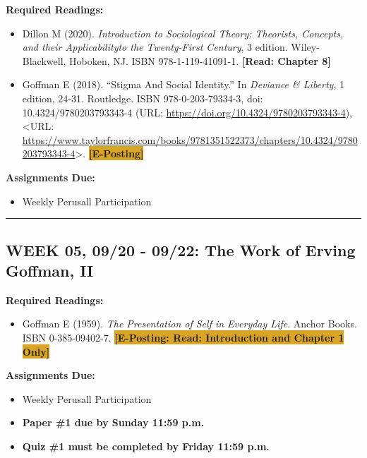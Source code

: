 \documentclass[11pt,]{article}
\providecommand{\tightlist}{%
  \setlength{\itemsep}{0pt}\setlength{\parskip}{0pt}}
\begin{document}
\textbf{Required Readings:}

\begin{itemize}
\item
  Dillon M (2020). \emph{Introduction to Sociological Theory: Theorists,
  Concepts, and their Applicabilityto the Twenty-First Century}, 3
  edition. Wiley-Blackwell, Hoboken, NJ. ISBN 978-1-119-41091-1.
  \textcolor{BrickRed}{\bf{[Read: Chapter 8]}}
\item
  Goffman E (2018). ``Stigma And Social Identity.'' In \emph{Deviance \&
  Liberty}, 1 edition, 24-31. Routledge. ISBN 978-0-203-79334-3, doi:
  10.4324/9780203793343-4 (URL:
  \url{https://doi.org/10.4324/9780203793343-4}), \textless URL:
  \url{https://www.taylorfrancis.com/books/9781351522373/chapters/10.4324/9780203793343-4}\textgreater.
  \colorbox{Goldenrod}{\bf{[E-Posting]}}
\end{itemize}

\textbf{Assignments Due:}

\begin{itemize}
\tightlist
\item
  Weekly Perusall Participation
\end{itemize}

\bigbreak
\hrule

\hypertarget{week-05-0920---0922-the-work-of-erving-goffman-ii}{%
\subsection{WEEK 05, 09/20 - 09/22: The Work of Erving Goffman,
II}\label{week-05-0920---0922-the-work-of-erving-goffman-ii}}

\textbf{Required Readings:}

\begin{itemize}
\tightlist
\item
  Goffman E (1959). \emph{The Presentation of Self in Everyday Life}.
  Anchor Books. ISBN 0-385-09402-7.
  \colorbox{Goldenrod}{\bf{[E-Posting: Read: Introduction and Chapter 1 Only]}}
\end{itemize}

\textbf{Assignments Due:}

\begin{itemize}
\tightlist
\item
  Weekly Perusall Participation
\item
  \textbf{Paper \#1 due by Sunday 11:59 p.m.}
\item
  \textbf{Quiz \#1 must be completed by Friday 11:59 p.m.}
\end{itemize}
\end{document}

